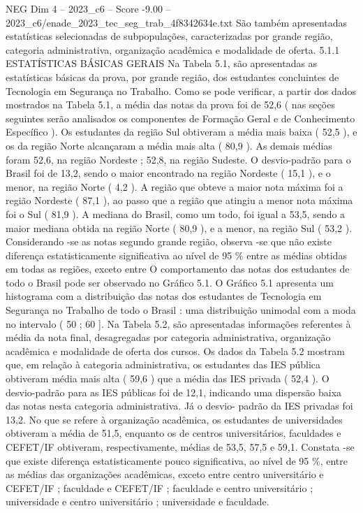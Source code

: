 \begin{textsample}{NEG Dim 4 – 2023\_c6 – Score -9.00 – 2023\_c6/enade\_2023\_tec\_seg\_trab\_4f8342634e.txt}
São também apresentadas estatísticas selecionadas de subpopulações, caracterizadas por grande região, categoria administrativa, organização acadêmica e modalidade de oferta. 5.1.1 ESTATÍSTICAS BÁSICAS GERAIS Na Tabela 5.1, são apresentadas as estatísticas básicas da prova, por grande região, dos estudantes concluintes de Tecnologia em Segurança no Trabalho.
Como se pode verificar, a partir dos dados mostrados na Tabela 5.1, a média das notas da prova foi de 52,6 ( nas seções seguintes serão analisados os componentes de Formação Geral e de Conhecimento Específico ).
Os estudantes da região Sul obtiveram a média mais baixa ( 52,5 ), e os da região Norte alcançaram a média mais alta ( 80,9 ).
As demais médias foram 52,6, na região Nordeste ; 52,8, na região Sudeste.
O desvio-padrão para o Brasil foi de 13,2, sendo o maior encontrado na região Nordeste ( 15,1 ), e o menor, na região Norte ( 4,2 ).
A região que obteve a maior nota máxima foi a região Nordeste ( 87,1 ), ao passo que a região que atingiu a menor nota máxima foi o Sul ( 81,9 ).
A mediana do Brasil, como um todo, foi igual a 53,5, sendo a maior mediana obtida na região Norte ( 80,9 ), e a menor, na região Sul ( 53,2 ).
Considerando -se as notas segundo grande região, observa -se que não existe diferença estatisticamente significativa ao nível de 95 \% entre as médias obtidas em todas as regiões, exceto entre O comportamento das notas dos estudantes de todo o Brasil pode ser observado no Gráfico 5.1.
O Gráfico 5.1 apresenta um histograma com a distribuição das notas dos estudantes de Tecnologia em Segurança no Trabalho de todo o Brasil : uma distribuição unimodal com a moda no intervalo ( 50 ; 60 ].
Na Tabela 5.2, são apresentadas informações referentes à média da nota final, desagregadas por categoria administrativa, organização acadêmica e modalidade de oferta dos cursos.
Os dados da Tabela 5.2 mostram que, em relação à categoria administrativa, os estudantes das IES pública obtiveram média mais alta ( 59,6 ) que a média das IES privada ( 52,4 ).
O desvio-padrão para as IES públicas foi de 12,1, indicando uma dispersão baixa das notas nesta categoria administrativa.
Já o desvio- padrão da IES privadas foi 13,2.
No que se refere à organização acadêmica, os estudantes de universidades obtiveram a média de 51,5, enquanto os de centros universitários, faculdades e CEFET/IF obtiveram, respectivamente, médias de 53,5, 57,5 e 59,1.
Constata -se que existe diferença estatisticamente pouco significativa, ao nível de 95 \%, entre as médias das organizações acadêmicas, exceto entre centro universitário e CEFET/IF ; faculdade e CEFET/IF ; faculdade e centro universitário ; universidade e centro universitário ; universidade e faculdade.

\end{textsample}
